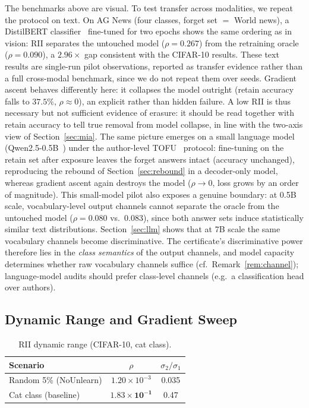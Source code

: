 \documentclass[smallextended]{svjour3}       %
\begin{document}
The benchmarks above are visual. To test transfer across modalities, we repeat the protocol on text. On AG News (four classes, forget set $=$ World news), a DistilBERT classifier~\cite{sanh2020distilbert} fine-tuned for two epochs shows the same ordering as in vision: RII separates the untouched model ($\rho{=}0.267$) from the retraining oracle ($\rho{=}0.090$), a $2.96{\times}$ gap consistent with the CIFAR-10 results. These text results are single-run pilot observations, reported as transfer evidence rather than a full cross-modal benchmark, since we do not repeat them over seeds. Gradient ascent behaves differently here: it collapses the model outright (retain accuracy falls to $37.5\%$, $\rho{\approx}0$), an explicit rather than hidden failure. A low RII is thus necessary but not sufficient evidence of erasure: it should be read together with retain accuracy to tell true removal from model collapse, in line with the two-axis view of Section~\ref{sec:mia}. The same picture emerges on a small language model (Qwen2.5-0.5B~\cite{qwen2024qwen2}) under the author-level TOFU~\cite{maini2024tofu} protocol: fine-tuning on the retain set after exposure leaves the forget answers intact (accuracy unchanged), reproducing the rebound of Section~\ref{sec:rebound} in a decoder-only model, whereas gradient ascent again destroys the model ($\rho{\to}0$, loss grows by an order of magnitude). This small-model pilot also exposes a genuine boundary: at 0.5B scale, vocabulary-level output channels cannot separate the oracle from the untouched model ($\rho{=}0.080$ vs.\ $0.083$), since both answer sets induce statistically similar text distributions. Section~\ref{sec:llm} shows that at 7B scale the same vocabulary channels become discriminative. The certificate's discriminative power therefore lies in the \emph{class semantics} of the output channels, and model capacity determines whether raw vocabulary channels suffice (cf.\ Remark~\ref{rem:channel}); language-model audits should prefer class-level channels (e.g.\ a classification head over authors).

\subsection{Dynamic Range and Gradient Sweep}

\begin{table}[t]
\centering
\small
\caption{RII dynamic range (CIFAR-10, cat class).}\label{tab:dynamic_range}
\setlength{\tabcolsep}{2pt}
\begin{tabular}{l c c}
\toprule
Scenario & $\rho$ & $\sigma_2/\sigma_1$ \\
\midrule
Random 5\% (NoUnlearn) & $1.20\times10^{-3}$ & 0.035 \\
Cat class (baseline)   & $\mathbf{1.83\times10^{-1}}$ & 0.47 \\
\bottomrule
\end{tabular}
\end{table}
\end{document}
